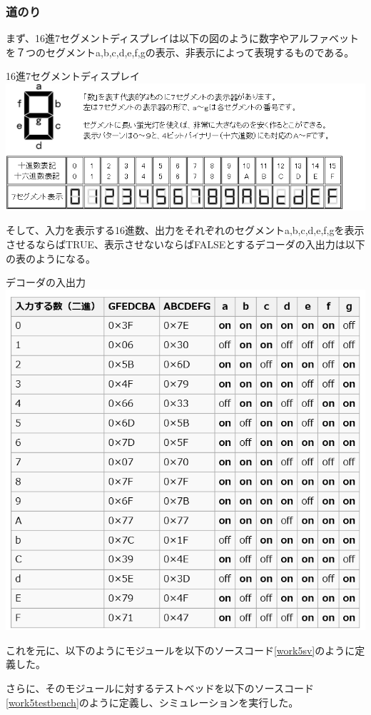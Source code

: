 \documentclass[a4paper]{jarticle}
\begin{document}
\subsubsection{道のり}
まず、16進7セグメントディスプレイは以下の図のように数字やアルファベットを７つのセグメントa,b,c,d,e,f,gの表示、非表示によって表現するものである。
\begin{center}
	16進7セグメントディスプレイ
	\includegraphics[width=15cm]{5-2.PNG}
\end{center}
そして、入力を表示する16進数、出力をそれぞれのセグメントa,b,c,d,e,f,gを表示させるならばTRUE、表示させないならばFALSEとするデコーダの入出力は以下の表のようになる。
\begin{center}
	デコーダの入出力
	\includegraphics[width=15cm]{5-1.PNG}
\end{center}
これを元に、以下のようにモジュールを以下のソースコード\ref{work5sv}のように定義した。

さらに、そのモジュールに対するテストベッドを以下のソースコード\ref{work5testbench}のように定義し、シミュレーションを実行した。

\end{document}

